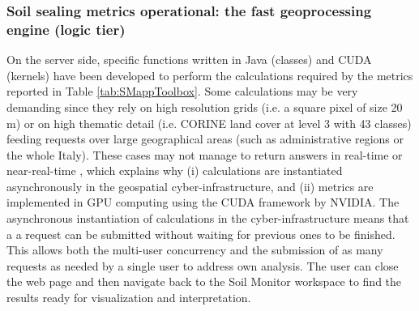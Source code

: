 \documentclass[APA,LATO1COL,doublespace]{WileyNJD-v2}
\newcommand{\update}[1]{\emph{\textcolor{blue}{#1}}}     %
\begin{document}
\subsubsection{ Soil sealing metrics operational: the fast geoprocessing engine (logic tier) } %
\label{sec:logicTier}
On the server side, specific functions written in Java (classes) and CUDA (kernels) have been developed to perform the calculations required by the metrics reported in Table \ref{tab:SMappToolbox}. 
Some calculations may be very demanding since they rely on high resolution grids (i.e. a square pixel of size 20 m) or on high thematic detail (i.e. CORINE land cover at level 3 with 43 classes) feeding requests over large geographical areas (such as administrative regions or the whole Italy).
These cases may not manage to return answers in real-time or near-real-time
, which explains why 
(i) calculations are instantiated asynchronously in the geospatial cyber-infrastructure, and
(ii) metrics are implemented in GPU computing using the CUDA framework by NVIDIA.
The asynchronous instantiation of calculations in the cyber-infrastructure means that a a request can be submitted without waiting for previous ones to be finished.
This allows both the multi-user concurrency and the submission of as many requests as needed by a single user to address own analysis.
The user can close the web page and then navigate back to the Soil Monitor workspace to find the results ready for visualization and interpretation.
\end{document}
